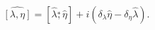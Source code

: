 \begin{equation}
\widehat{[\lambda,\eta]}=[\widehat\lambda\stackrel{*}{,}\widehat\eta]+
i\left(\delta_\lambda\widehat\eta-\delta_\eta\widehat\lambda\right).\label{parametros}
\end{equation}


